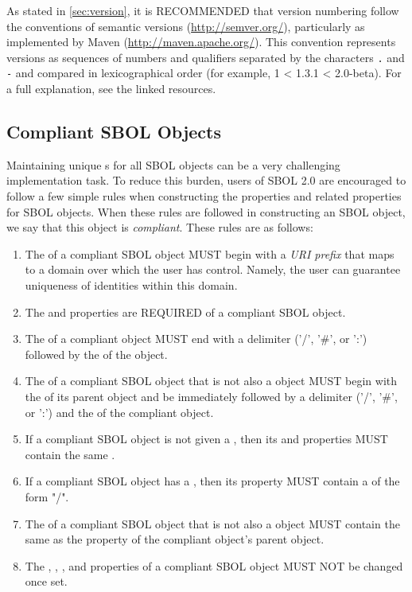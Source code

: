As stated in \ref{sec:version},  it is RECOMMENDED that version numbering follow the conventions of semantic versions (\url{http://semver.org/}), particularly as implemented by Maven (\url{http://maven.apache.org/}).  
This convention represents versions as sequences of numbers and qualifiers separated by the characters {\tt .} and {\tt -} and compared in lexicographical order (for example, 1 < 1.3.1 < 2.0-beta).  For a full explanation, see the linked resources.

\subsection{Compliant SBOL Objects}
\label{sec:compliant}

Maintaining unique  s for all SBOL objects can be a very challenging implementation task.  To reduce this burden, users of SBOL 2.0 are encouraged to follow a few simple rules when constructing the  properties and related properties for SBOL objects.  When these rules are followed in constructing an SBOL object, we say that this object is \emph{compliant}. These rules are as follows:
\begin{enumerate}
\item The  of a compliant SBOL object MUST begin with a \emph{URI prefix} that maps to a domain over which the user has control. Namely, the user can guarantee uniqueness of identities within this domain.
\item The  and  properties are REQUIRED of a compliant SBOL object.
\item The  of a compliant  object MUST end with a delimiter ('/', '\#', or ':') followed by the  of the object. 
\item The  of a compliant SBOL object that is not also a  object MUST begin with the  of its parent object and be immediately followed by a delimiter ('/', '\#', or ':') and the  of the compliant object.
\item If a compliant SBOL object is not given a , then its  and  properties MUST contain the same .
\item If a compliant SBOL object has a , then its  property MUST contain a  of the form  "/".
\item The  of a compliant SBOL object that is not also a  object MUST contain the same  as the  property of the compliant object's parent object.
\item The , , , and  properties of a compliant SBOL object MUST NOT be changed once set.
\end{enumerate}

